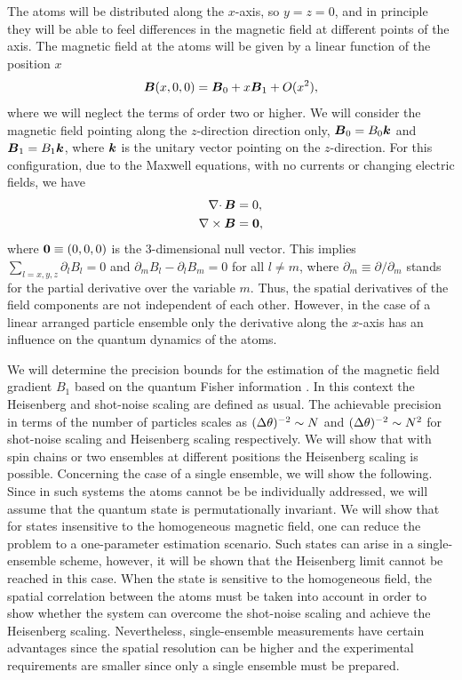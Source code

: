 The atoms will be distributed along the $x$-axis, so $y=z=0$, and in principle they will be able to feel differences in the magnetic field at different points of the axis.
The magnetic field at the atoms will be given by a linear function of the position $x$
\begin{equation}
\boldsymbol{B}(x,0,0)=\boldsymbol{B}_0 +x \boldsymbol{B}_1 + O(x^2),
\end{equation}
where we will neglect the terms of order two or higher.
We will consider the magnetic field pointing along the $z$-direction direction only, $\boldsymbol{B}_0=B_0 \boldsymbol{k}$ and $\boldsymbol{B}_1=B_1\boldsymbol{k}$, where $\boldsymbol{k}$ is the unitary vector pointing on the $z$-direction.
For this configuration, due to the Maxwell equations, with no currents or changing electric fields, we have
\begin{align}
\nabla \cdotp \boldsymbol{B}&=0, \nonumber \\
\nabla \times \boldsymbol{B}&=\boldsymbol{0},
\end{align}
where $\boldsymbol{0}\equiv (0,0,0)$ is the 3-dimensional null vector.
This implies $\sum_{l=x,y,z} \partial_l B_l=0$ and $ \partial_m B_l - \partial_l B_m =0$ for all $l\ne m$, where $\partial_m\equiv \partial/\partial_m$ stands for the partial derivative over the variable $m$.
Thus, the spatial derivatives of the field components are not independent of each other.
However, in the case of a linear arranged particle ensemble only the derivative along the $x$-axis has an influence on the quantum dynamics of the atoms.

We will determine the precision bounds for the estimation of the magnetic field gradient $B_1$ based on the quantum Fisher information \cite{Paris2009,Braunstein1994,Holevo1982,Helstrom1976,Petz2002,Petz2008}.
In this context the Heisenberg and shot-noise scaling are defined as usual.
The achievable precision in terms of the number of particles scales as $(\Delta \theta )^{-2}\sim N$ and $(\Delta \theta )^{-2}\sim N^2$ for shot-noise scaling and Heisenberg scaling respectively.
We will show that with spin chains or two ensembles at different positions the Heisenberg scaling is possible.
Concerning the case of a single ensemble, we will show the following.
Since in such systems the atoms cannot be be individually addressed, we will assume that the quantum state is permutationally invariant.
We will show that for states insensitive to the homogeneous magnetic field, one can reduce the problem to a one-parameter estimation scenario.
Such states can arise in a single-ensemble scheme, however, it will be shown that the Heisenberg limit cannot be reached in this case.
When the state is sensitive to the homogeneous field, the spatial correlation between the atoms must be taken into account in order to show whether the system can overcome the shot-noise scaling and achieve the Heisenberg scaling.
Nevertheless, single-ensemble measurements have certain advantages since the spatial resolution can be higher and the experimental requirements are smaller since only a single ensemble must be prepared.

